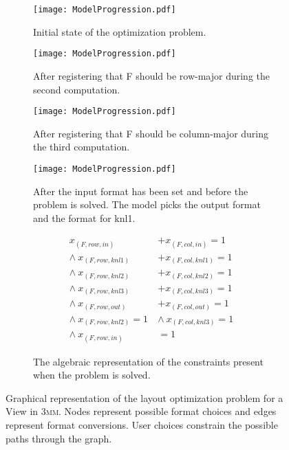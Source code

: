 \begin{figure}
	\centering
	\begin{subfigure}[t]{0.3\columnwidth}
		\texttt{[image: ModelProgression.pdf]}
		\caption{Initial state of the optimization problem.}\label{graphModel:1}
	\end{subfigure}
	\hspace{0.03\columnwidth}
	\begin{subfigure}[t]{0.3\columnwidth}
		\texttt{[image: ModelProgression.pdf]}
		\caption{After registering that F should be row-major during the second computation.}\label{graphModel:2}
	\end{subfigure}
	\hspace{0.03\columnwidth}
	\begin{subfigure}[t]{0.3\columnwidth}
		\texttt{[image: ModelProgression.pdf]}
		\caption{After registering that F should be column-major during the third computation.}\label{graphModel:3}
	\end{subfigure}
	
	\begin{subfigure}[t]{0.3\columnwidth}
		\texttt{[image: ModelProgression.pdf]}
		\caption{After the input format has been set and before the problem is solved. The model picks the output format and the format for knl1.}\label{graphModel:4}
	\end{subfigure}
	\hspace{0.03\columnwidth}
	\begin{subfigure}[t][0.15\columnwidth][b]{0.4\columnwidth}
		\begin{align*}
			x_{(F,row,in)} &+ x_{(F,col,in)} = 1 \\
			 \wedge \ x_{(F,row,knl1)} &+ x_{(F,col,knl1)} = 1 \\
			\wedge \ x_{(F,row,knl2)} &+ x_{(F,col,knl2)} = 1 \\
		  \wedge \ x_{(F,row,knl3)} &+ x_{(F,col,knl3)} = 1  \\
			\wedge \ x_{(F,row,out)} &+ x_{(F,col,out)} = 1 \\
			\wedge \ x_{(F,row,knl2)} = 1 \ &\wedge \ x_{(F,col,knl3)} = 1 \\
			\wedge \ x_{(F,row,in)}& = 1
		\end{align*}
		\caption{The algebraic representation of the constraints present when the problem is solved.}\label{graphModel:5}
	\end{subfigure}

	\caption{Graphical representation of the layout optimization problem for a View in \textsc{3mm}. Nodes represent possible format choices and edges represent format conversions. User choices constrain the possible paths through the graph.}\label{graphModel}
\end{figure}

